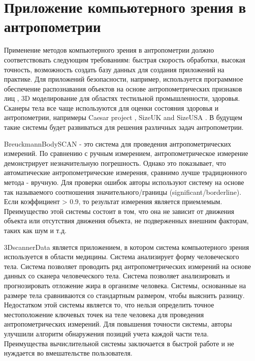 \section{Приложение компьютерного зрения в антропометрии}

Применение методов компьютерного зрения в антропометрии должно соответствовать следующим требованиям: быстрая скорость обработки, высокая точность, возможность создать базу данных для создания приложений на практике. Для приложений безопасности, например, используется программное обеспечение распознавания объектов на основе антропометрических признаков лиц \cite{Graham1997}, 3D моделирование \cite{Zouhour2006} для областях тестильной промышленности, здоровья. Сканеры тела все чаще используются для оценки состояния здоровья и антропометрии, напримеры Caesar project \cite{Robinette2006}, SizeUK \cite{Uk2013} and SizeUSA \cite{Usa2013}. В будущем такие системы будет развиваться для решения различных задач антропометрии.

BreuckmannBodySCAN \cite{Hexagon2016} - это система для проведения антропометрических измерений. По сравнению с ручным измерением, антропометрическое измерение демонстрирует незначительную погрешность. Однако это показывает, что автоматические антропометрические измерения, сравнимо лучше традиционного метода - вручную. Для проверки ошибок авторы используют систему на основе так называемого соотношения значительного/границы (significant/borderline). Если коэффициент > 0.9, то результат измерения является приемлемым. Преимущество этой системы состоит в том, что она не зависит от движения объекта или отсутствия движения объекта, не подверженных внешним факторам, таких как шум и т.д.

3DscannerData \cite{Sobota2009} является приложением, в котором система компьютерного зрения используется в области медицины. Система анализирует форму человеческого тела. Система позволяет проводить ряд антропометрических измерений на основе данных со сканера человеческого тела. Система позволяет анализировать и прогнозировать отложение жира в организме человека. Системы, основанные на размере тела сравниваются со стандартным размером, чтобы выяснить разницу. Недостатком этой системы является то, что нельзя определить точное местоположение ключевых точек на теле человека для проведения антропометрических измерений. Для повышения точности системы, авторы улучшили алгоритм обнаружения позиций учета каждой части тела. Преимущества вычислительной системы заключается в быстрой работе и не нуждается во вмешательстве  пользователя.

